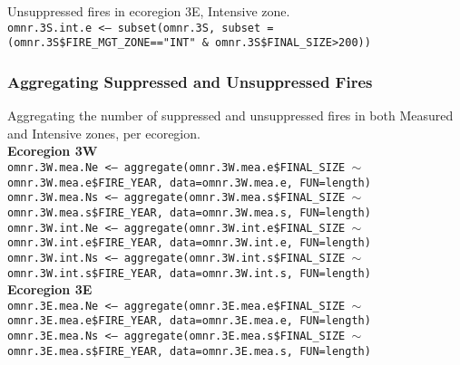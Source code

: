 \begin{spacing}{1.5}
\noindent Unsuppressed fires in ecoregion 3E, Intensive zone. \\

\noindent \texttt{omnr.3S.int.e <-- subset(omnr.3S, subset = (omnr.3S\$FIRE\_MGT\_ZONE==\linebreak "INT" \& omnr.3S\$FINAL\_SIZE>200))}

\subsubsection{Aggregating Suppressed and Unsuppressed Fires}
Aggregating the number of suppressed and unsuppressed fires in both Measured and Intensive zones, per ecoregion.\\

\noindent \textbf{Ecoregion 3W} \\

\noindent \texttt{omnr.3W.mea.Ne <-- aggregate(omnr.3W.mea.e\$FINAL\_SIZE $\sim$ omnr.3W.mea.\linebreak e\$FIRE\_YEAR, data=omnr.3W.mea.e, FUN=length)} \\

\noindent \texttt{omnr.3W.mea.Ns <-- aggregate(omnr.3W.mea.s\$FINAL\_SIZE $\sim$ omnr.3W.mea.\linebreak s\$FIRE\_YEAR, data=omnr.3W.mea.s, FUN=length)} \\

\noindent \texttt{omnr.3W.int.Ne <-- aggregate(omnr.3W.int.e\$FINAL\_SIZE $\sim$ omnr.3W.int.\linebreak e\$FIRE\_YEAR, data=omnr.3W.int.e, FUN=length)} \\

\noindent \texttt{omnr.3W.int.Ns <-- aggregate(omnr.3W.int.s\$FINAL\_SIZE $\sim$ omnr.3W.int.\linebreak s\$FIRE\_YEAR, data=omnr.3W.int.s, FUN=length)} \\

\noindent \textbf{Ecoregion 3E} \\

\noindent \texttt{omnr.3E.mea.Ne <-- aggregate(omnr.3E.mea.e\$FINAL\_SIZE $\sim$ omnr.3E.mea.\linebreak e\$FIRE\_YEAR, data=omnr.3E.mea.e, FUN=length)} \\

\noindent \texttt{omnr.3E.mea.Ns <-- aggregate(omnr.3E.mea.s\$FINAL\_SIZE $\sim$ omnr.3E.mea.\linebreak s\$FIRE\_YEAR, data=omnr.3E.mea.s, FUN=length)} \\


\end{spacing}
